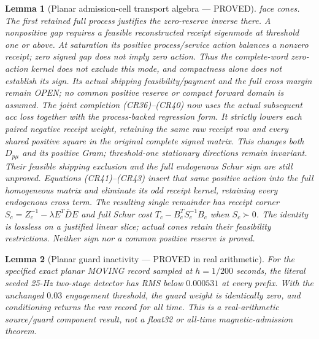 \documentclass[journal]{IEEEtran}
\newtheorem{lemma}{Lemma}\newtheorem{theorem}{Theorem}\newtheorem{proposition}{Proposition}\newtheorem{remark}{Remark}\newtheorem{corollary}{Corollary}
\begin{document}
\begin{lemma}[Planar admission-cell transport algebra --- PROVED]
face cones. The first retained full process justifies the zero-reserve
inverse there. A nonpositive gap requires a feasible reconstructed
receipt eigenmode at threshold one or above. At saturation its positive
process/service action balances a nonzero receipt; zero signed gap does
not imply zero action. Thus the complete-word zero-action kernel does
not exclude this mode, and compactness alone does not establish its sign.
Its actual shipping feasibility/payment and the full cross margin remain
OPEN; no common positive reserve or compact forward domain is assumed.
The joint completion (CR36)--(CR40) now uses the actual subsequent acc
loss together with the process-backed regression form. It strictly lowers
each paired negative receipt weight, retaining the same raw receipt row
and every shared positive square in the original complete signed matrix.
This changes both $D_{p\mu}$ and its positive Gram; threshold-one stationary
directions remain invariant. Their feasible shipping exclusion and the
full endogenous Schur sign are still unproved.
Equations (CR41)--(CR43) insert that same positive action into the full
homogeneous matrix and eliminate its odd receipt kernel, retaining every
endogenous cross term. The resulting single remainder has receipt corner
$S_c=Z_c^{-1}-\lambda E^T\bar D E$ and full Schur cost
$T_c-B_c^TS_c^{-1}B_c$ when $S_c\succ0$. The identity is lossless on a
justified linear slice; actual cones retain their feasibility restrictions.
Neither sign nor a common positive reserve is proved.
\end{lemma}

\begin{lemma}[Planar guard inactivity --- PROVED in real arithmetic]
For the specified exact planar MOVING record sampled at $h=1/200$ seconds,
the literal seeded 25-Hz two-stage detector has RMS below $0.000531$ at every
prefix. With the unchanged $0.03$ engagement threshold, the guard weight is
identically zero, and conditioning returns the raw record for all time.
This is a real-arithmetic source/guard component result, not a float32 or
all-time magnetic-admission theorem.
\end{lemma}
\end{document}
